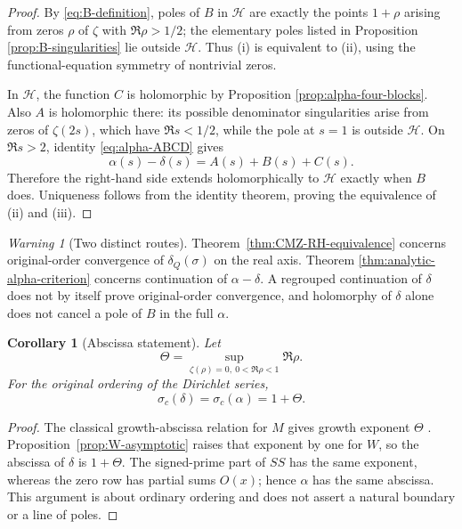 \documentclass[11pt]{amsart}
\numberwithin{equation}{section}
\theoremstyle{plain}
\newtheorem{corollary}[theorem]{Corollary}
\theoremstyle{definition}
\theoremstyle{remark}
\newtheorem{warning}[theorem]{Warning}
\begin{document}
\begin{proof}
By \eqref{eq:B-definition}, poles of $B$ in $\mathcal H$ are exactly the
points $1+\rho$ arising from zeros $\rho$ of $\zeta$ with
$\Re\rho>1/2$; the elementary poles listed in Proposition
\ref{prop:B-singularities} lie outside $\mathcal H$.  Thus (i) is equivalent
to (ii), using the functional-equation symmetry of nontrivial zeros.

In $\mathcal H$, the function $C$ is holomorphic by Proposition
\ref{prop:alpha-four-blocks}.  Also $A$ is holomorphic there: its possible
denominator singularities arise from zeros of $\zeta(2s)$, which have
$\Re s<1/2$, while the pole at $s=1$ is outside $\mathcal H$.  On
$\Re s>2$, identity \eqref{eq:alpha-ABCD} gives
\begin{equation}
\alpha(s)-\delta(s)=A(s)+B(s)+C(s).
\label{eq:alpha-minus-delta}
\end{equation}
Therefore the right-hand side extends holomorphically to $\mathcal H$ exactly
when $B$ does.  Uniqueness follows from the identity theorem, proving the
equivalence of (ii) and (iii).
\end{proof}

\begin{warning}[Two distinct routes]
\label{warn:two-routes}
Theorem~\ref{thm:CMZ-RH-equivalence} concerns original-order convergence of
$\delta_Q(\sigma)$ on the real axis.  Theorem
\ref{thm:analytic-alpha-criterion} concerns continuation of
$\alpha-\delta$.  A regrouped continuation of $\delta$ does not by itself
prove original-order convergence, and holomorphy of $\delta$ alone does not
cancel a pole of $B$ in the full $\alpha$.
\end{warning}

\begin{corollary}[Abscissa statement]
\label{cor:abscissa}
Let
\begin{equation}
\Theta=\sup_{\zeta(\rho)=0,\ 0<\Re\rho<1}\Re\rho.
\label{eq:Theta-definition}
\end{equation}
For the original ordering of the Dirichlet series,
\begin{equation}
\sigma_c(\delta)=\sigma_c(\alpha)=1+\Theta.
\label{eq:abscissae}
\end{equation}
\end{corollary}

\begin{proof}
The classical growth-abscissa relation for $M$ gives growth exponent
$\Theta$ \cite{Titchmarsh1986}.  Proposition~\ref{prop:W-asymptotic} raises
that exponent by one for $W$, so the abscissa of $\delta$ is $1+\Theta$.
The signed-prime part of $SS$ has the same exponent, whereas the zero row has
partial sums $O(x)$; hence $\alpha$ has the same abscissa.  This argument is
about ordinary ordering and does not assert a natural boundary or a line of
poles.
\end{proof}
\end{document}
